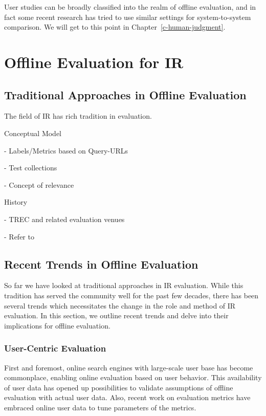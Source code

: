 \documentclass[openany]{now} %
\newcommand{\newpar}{\bigskip\noindent}
\begin{document}
User studies can be broadly classified into the realm of offline evaluation, and in fact some recent research \cite{Xu:2009} has tried to use similar settings for system-to-system comparison. We will get to this point in Chapter~\ref{c-human-judgment}.

\section{Offline Evaluation for IR}

\subsection{Traditional Approaches in Offline Evaluation}

The field of IR has rich tradition in evaluation. %

Conceptual Model

- Labels/Metrics based on Query-URLs

- Test collections 

- Concept of relevance 

\newpar
History

- TREC and related evaluation venues \cite{INR-009}

- Refer to \cite{borlund2003} \cite{cleverdon67} \cite{voor:trec05}

\subsection{Recent Trends in Offline Evaluation}

So far we have looked at traditional approaches in IR evaluation. While this tradition has served the community well for the past few decades, there has been several trends which necessitates the change in the role and method of IR evaluation. In this section, we outline recent trends and delve into their implications for offline evaluation.

\subsubsection{User-Centric Evaluation}
First and foremost, online search engines with large-scale user base has become commonplace, enabling online evaluation based on user behavior. This availability of user data has opened up possibilities to validate assumptions of offline evaluation with actual user data. Also, recent work on evaluation metrics \cite{} \cite{} have embraced online user data to tune parameters of the metrics.
\end{document}
